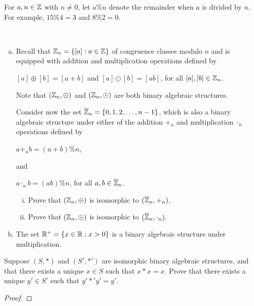 \documentclass[11pt,fleqn,dvipsnames,usenames]{article}
\newcommand{\p}{\noindent}
\begin{document}
%
\notation For $a,n\in\mathbb{Z}$ with $n\neq 0$, let $a \% n$ denote the remainder when $a$ is divided by $n$.  For example, $15 \% 4 = 3$ and $8 \% 2 = 0$.
%
\begin{examples}~
\begin{enumerate}[(a)]
\item Recall that $\mathbb{Z}_{n} = \left\{[a]:a\in\mathbb{Z}\right\}$ of congruence classes modulo $n$ and is equipped with addition and multiplication operations defined by
\begin{center}
$[a]\oplus [b] = [a + b]$ and $[a]\odot [b] = [ab]$, for all $[a],[b]\in\mathbb{Z}_{n}$.
\end{center}
\p Note that $(\mathbb{Z}_{n},\oplus)$ and $(\mathbb{Z}_{n},\odot)$ are both binary algebraic structures.
\vsmsp

\p Consider now the set $\overline{\mathbb{Z}}_{n} = \left\{0,1,2,\ldots, n-1\right\}$, which is also a binary algebraic structure under either of the addition $+_{n}$ and multiplication $\cdot_{n}$ operations defined by
\begin{center}
$a+_{n}b = (a + b)\% n$,
\end{center}
and
\begin{center}
$a\cdot_{n}b = (ab)\% n$, for all $a,b\in\overline{\mathbb{Z}}_{n}$.
\end{center}
\vsmsp

\begin{enumerate}[(i)]
\item Prove that $(\mathbb{Z}_{n},\oplus)$ is isomorphic to $(\overline{\mathbb{Z}}_{n},+_{n})$.
\newpage

\item Prove that $(\mathbb{Z}_{n},\odot)$ is isomorphic to $(\overline{\mathbb{Z}}_{n},\cdot_{n})$.
\end{enumerate}
\vsp

%
\item The set $\mathbb{R}^{+} = \left\{x\in\mathbb{R}:x>0\right\}$ is a binary algebraic structure under multiplication.
\vspace{6cm}

\end{enumerate}
\newpage
\end{examples}
%

\begin{lemma}\label{selfsquarelemma}
Suppose $(S,*)$ and $(S',*')$ are isomorphic binary algebraic structures, and that there exists a unique $x\in S$ such that $x*x = x$.  Prove that there exists a unique $y'\in S'$ such that $y'*'y' = y'$.
\end{lemma}
%
\begin{proof}\phantom{-}
\end{proof}
\vspace{8cm}
\end{document}
